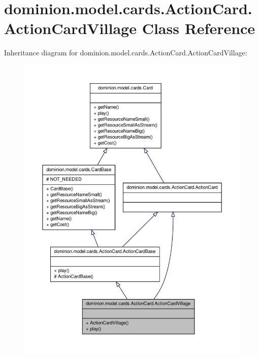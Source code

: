 \hypertarget{classdominion_1_1model_1_1cards_1_1ActionCard_1_1ActionCardVillage}{\section{dominion.\-model.\-cards.\-Action\-Card.\-Action\-Card\-Village \-Class \-Reference}
\label{classdominion_1_1model_1_1cards_1_1ActionCard_1_1ActionCardVillage}
}


\-Inheritance diagram for dominion.\-model.\-cards.\-Action\-Card.\-Action\-Card\-Village\-:
\nopagebreak
\begin{figure}[H]
\begin{center}
\leavevmode
\includegraphics[width=350pt]{classdominion_1_1model_1_1cards_1_1ActionCard_1_1ActionCardVillage__inherit__graph}
\end{center}
\end{figure}


